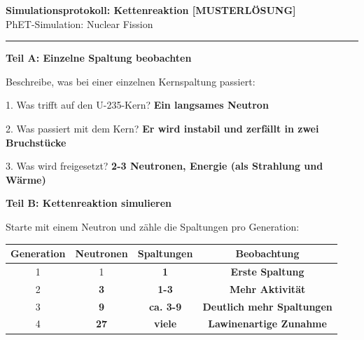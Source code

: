 \documentclass[10pt, a4paper]{article}
\newcommand{\fachfarbe}{physik}
\newcommand{\lsg}[1]{\textcolor{loesung}{\textbf{#1}}}
\newcommand{\abschnitt}[1]{%
    \vspace{8pt}\noindent\textbf{\textcolor{\fachfarbe}{#1}}\vspace{4pt}
}
\begin{document}

\newpage

\begin{center}
{\large\bfseries Simulationsprotokoll: Kettenreaktion \textcolor{loesung}{[MUSTERLÖSUNG]}}\\[2pt]
{\small\textcolor{grau}{PhET-Simulation: Nuclear Fission}}
\end{center}
\vspace{-2pt}\hrule\vspace{12pt}

\abschnitt{Teil A: Einzelne Spaltung beobachten}

\begin{merksatz}[Beobachtung]
Beschreibe, was bei einer einzelnen Kernspaltung passiert:

\vspace{4pt}
1. Was trifft auf den U-235-Kern? \lsg{Ein langsames Neutron}

\vspace{4pt}
2. Was passiert mit dem Kern? \lsg{Er wird instabil und zerfällt in zwei Bruchstücke}

\vspace{4pt}
3. Was wird freigesetzt? \lsg{2-3 Neutronen, Energie (als Strahlung und Wärme)}
\end{merksatz}

\vspace{8pt}

\abschnitt{Teil B: Kettenreaktion simulieren}

Starte mit einem Neutron und zähle die Spaltungen pro Generation:

\vspace{6pt}

\begin{tabular}{|c|c|c|c|}
\hline
\textbf{Generation} & \textbf{Neutronen} & \textbf{Spaltungen} & \textbf{Beobachtung} \\
\hline
1 & 1 & \lsg{1} & \lsg{Erste Spaltung} \\
\hline
2 & \lsg{3} & \lsg{1-3} & \lsg{Mehr Aktivität} \\
\hline
3 & \lsg{9} & \lsg{ca. 3-9} & \lsg{Deutlich mehr Spaltungen} \\
\hline
4 & \lsg{27} & \lsg{viele} & \lsg{Lawinenartige Zunahme} \\
\hline
\end{tabular}
\end{document}
